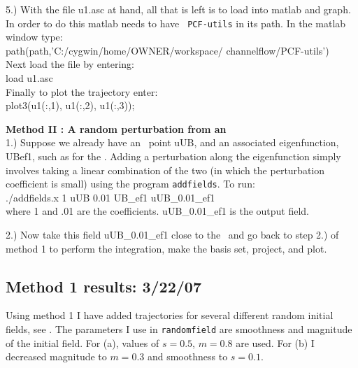 \documentclass[pre,twocolumn,groupedaddress]{revtex4}
\begin{document}
{5.) With the file u1.asc at hand, all that is left is to load into
matlab and graph. In order to do this matlab needs to have {\tt
PCF-utils}
in its path. In the matlab window type: \\
path(path,'C:/cygwin/home/OWNER/workspace/
channelflow/PCF-utils') \\
Next load the file by entering: \\
load u1.asc \\
Finally to plot the trajectory enter: \\
plot3(u1(:,1), u1(:,2), u1(:,3));

\textbf{Method II : A random perturbation from an \eqv} \\
1.) Suppose we already have an \eqv\ point uUB, and an associated
eigenfunction, UBef1, such as for the \ubranch. Adding a
perturbation along the eigenfunction simply involves taking a linear
combination of the two (in which the perturbation coefficient is
small) using the program {\tt addfields}. To run: \\
./addfields.x 1 uUB 0.01 UB\_ef1 uUB\_0.01\_ef1 \\
where 1 and .01 are the coefficients. uUB\_0.01\_ef1 is the output
field.

2.) Now take this field uUB\_0.01\_ef1 close to the \eqv\ and go
back to step 2.) of method 1 to perform the integration, make the
basis set, project, and plot.


\subsection{Method 1 results: 3/22/07}
Using method 1 I have added trajectories for several different
random initial fields, see . The parameters I use in {\tt randomfield} are smoothness and
magnitude of the initial field. For (a),
 values of $s = 0.5$, $ m = 0.8$ are used. For
(b) I decreased magnitude to $m = 0.3$ and
smoothness to  $s=0.1$.

}
\end{document}
